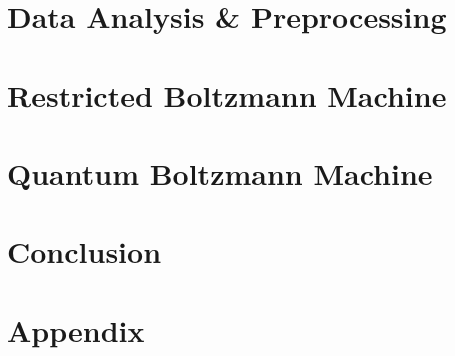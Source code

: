 \documentclass[11pt,twoside]{report}
\begin{document}
\chapter{Data Analysis \& Preprocessing}
\label{ch:data_analysis}


\chapter{Restricted Boltzmann Machine}
\label{ch:rbm}


\chapter{Quantum Boltzmann Machine}
\label{ch:qbm}


\chapter{Conclusion}
\label{ch:conclusion}


\appendix
\chapter{Appendix}
\label{ch:appendix}


\printbibliography
\end{document}
